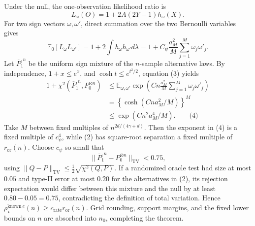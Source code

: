 Under the null, the one-observation likelihood ratio is
\[
 L_\omega(O)=1+2A(2Y-1)h_\omega(X).
\]
For two sign vectors \(\omega,\omega'\), direct summation over the two Bernoulli variables gives
\[
 \mathbb E_0[L_\omega L_{\omega'}]
 =1+2\int h_\omega h_{\omega'}d\lambda
 =1+C_\psi\frac{a_M^2}{M}\sum_{j=1}^M\omega_j\omega'_j. \tag{3}
\]
Let \(\overline P_1^{,n}\) be the uniform sign mixture of the \(n\)-sample alternative laws.  By independence, \(1+x\le e^x\), and \(\cosh t\le e^{t^2/2}\), equation (3) yields
\[
\begin{aligned}
 1+\chi^2(\overline P_1^{,n},P_0^{\otimes n})
 &\le \mathbb E_{\omega,\omega'}
   \exp\!\left(Cn\frac{a_M^2}{M}
                    \sum_{j=1}^M\omega_j\omega'_j\right)\\
 &=\left\{\cosh(Cna_M^2/M)\right\}^M\\
 &\le\exp(Cn^2a_M^4/M). \qquad\text{(4)}
\end{aligned}
\]
Take \(M\) between fixed multiples of \(n^{2d/(4\gamma+d)}\).  Then the exponent in (4) is a fixed multiple of \(c_\psi^4\), while (2) has square-root separation a fixed multiple of \(r_{\mathrm{or}}(n)\).  Choose \(c_\psi\) so small that
\[
 \|\overline P_1^{,n}-P_0^{\otimes n}\|_{\mathrm{TV}}<0.75,
\]
using \(\|Q-P\|_{\mathrm{TV}}\le\frac12\sqrt{\chi^2(Q,P)}\).  If a randomized oracle test had size at most \(0.05\) and type-II error at most \(0.20\) for the alternatives in (2), its rejection expectation would differ between this mixture and the null by at least \(0.80-0.05=0.75\), contradicting the definition of total variation.  Hence \(\rho_\star^{\mathrm{known}\ e}(n)\ge c_{\mathrm{rate}}r_{\mathrm{or}}(n)\).  Grid rounding, support margins, and the fixed lower bounds on \(n\) are absorbed into \(n_0\), completing the theorem.

